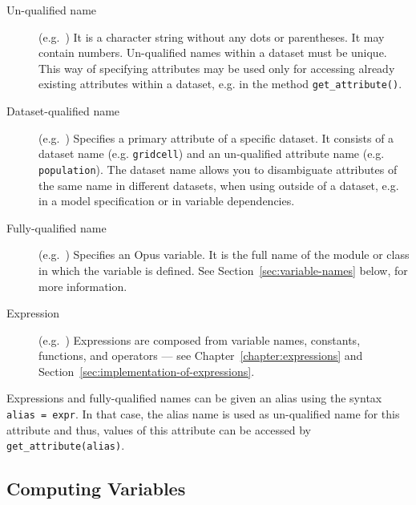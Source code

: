 \begin{description}
\item[Un-qualified name] (e.g.\ ) It is a character string
  without any dots or parentheses. It may contain numbers. Un-qualified
  names within a dataset must be unique. This way of
  specifying attributes may be used only for accessing
  already existing attributes within a dataset,
  e.g.  in the method
  \verb|get_attribute()|.

\item[Dataset-qualified name] (e.g.\ ) Specifies
  a primary attribute of a specific dataset. 
  It consists of a dataset name (e.g.  \verb|gridcell|) and
  an un-qualified attribute name (e.g.
  \verb|population|).  The dataset name allows you to
  disambiguate attributes of the same name in different
  datasets, when using outside of a dataset, 
  e.g. in a model specification or in variable
  dependencies.

\item[Fully-qualified name] (e.g.\ )
  Specifies an Opus variable. It is the full name of the
  module or class in which the variable is defined. See
  Section~\ref{sec:variable-names} below, for more information.

\item[Expression] (e.g.\ )
  Expressions are composed from variable names, constants, functions, and
  operators --- see Chapter~\ref{chapter:expressions} and 
  Section~\ref{sec:implementation-of-expressions}.

\end{description}
Expressions and fully-qualified names can be given an alias using the syntax
\verb|alias = expr|.  In that case, the alias name is used as un-qualified
name for this attribute and thus, values of this attribute can be accessed
by \verb|get_attribute(alias)|.

\subsection{Computing Variables}
\label{sec:core-dataset-compute-variables}

